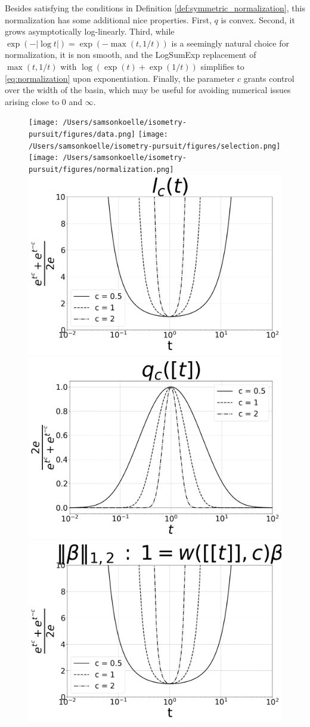 Besides satisfying the conditions in Definition \ref{def:symmetric_normalization}, this normalization has some additional nice properties.
First, $q$ is convex.
Second, it grows asymptotically log-linearly.
Third, while $\exp(-|\log t|) = \exp(-\max (t, 1/t))$ is a seemingly natural choice for normalization, it is non smooth, and the LogSumExp \citep{Boyd2004-ql} replacement of $\max (t, 1/t)$ with $ \log (\exp (t ) + \exp(1/t))$ simplifies to \ref{eq:normalization} upon exponentiation.
Finally, the parameter $c$ grants control over the width of the basin, which may be useful for avoiding numerical issues arising close to $0$ and $\infty$.

\begin{figure}
\centering
{\texttt{[image: /Users/samsonkoelle/isometry-pursuit/figures/data.png]}}
{\texttt{[image: /Users/samsonkoelle/isometry-pursuit/figures/selection.png]}}
{\texttt{[image: /Users/samsonkoelle/isometry-pursuit/figures/normalization.png]}}
{\includegraphics[width = .32\textwidth]{../figures/Figure_1a_bw.png}}
{\includegraphics[width = .32\textwidth]{../figures/Figure_1b_bw.png}}
{\includegraphics[width = .32\textwidth]{../figures/Figure_1c_bw.png}}


\end{figure}
